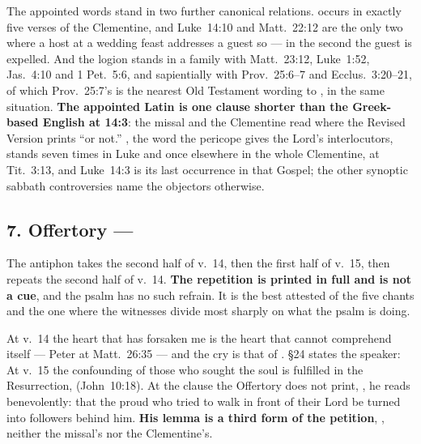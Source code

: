 The appointed words stand in two further canonical relations. 
occurs in exactly five verses of the Clementine, and Luke~14:10 and
Matt.~22:12 are the only two where a host at a wedding feast addresses a guest
so --- in the second the guest is expelled. And the logion stands in a family
with Matt.~23:12, Luke~1:52, Jas.~4:10 and 1 Pet.~5:6, and sapientially with
Prov.~25:6--7 and Ecclus.~3:20--21, of which Prov.~25:7's  is
the nearest Old Testament wording to , in the same
situation. \textbf{The appointed Latin is one clause shorter than the
Greek-based English at 14:3}: the missal and the Clementine read  where the Revised Version prints ``or not.''
, the word the pericope gives the Lord's interlocutors,
stands seven times in Luke and once elsewhere in the whole Clementine, at
Tit.~3:13, and Luke~14:3 is its last occurrence in that Gospel; the other
synoptic sabbath controversies name the objectors otherwise.

\subsection*{7. Offertory  --- }

The antiphon takes the second half of v.~14, then the first half of v.~15, then
repeats the second half of v.~14. \textbf{The repetition is printed in full and
is not a cue}, and the psalm has no such refrain. It is the best attested of the
five chants and the one where the witnesses divide most sharply on what the psalm
is doing.

\begin{witnessnote}
 At v.~14 the heart
that has forsaken me is the heart that cannot comprehend itself --- Peter at
Matt.~26:35 --- and the cry is that of . \S24 states the speaker:  At v.~15 the confounding of those who sought the soul is fulfilled in
the Resurrection, 
(John~10:18). At the clause the Offertory does not print, , he reads benevolently: that the proud who tried to walk in front of
their Lord be turned into followers behind him. \textbf{His lemma is a third
form of the petition}, , neither the missal's nor the Clementine's.
\end{witnessnote}

